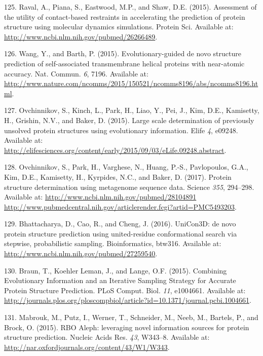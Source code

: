\documentclass[11pt,a4paper,twoside]{book}
\theoremstyle{definition}
\theoremstyle{definition}
\theoremstyle{remark}
\begin{document}
\hypertarget{ref-Raval2015a}{}
125. Raval, A., Piana, S., Eastwood, M.P., and Shaw, D.E. (2015).
Assessment of the utility of contact-based restraints in accelerating
the prediction of protein structure using molecular dynamics
simulations. Protein Sci. Available at:
\url{http://www.ncbi.nlm.nih.gov/pubmed/26266489}.

\hypertarget{ref-Wang2015}{}
126. Wang, Y., and Barth, P. (2015). Evolutionary-guided de novo
structure prediction of self-associated transmembrane helical proteins
with near-atomic accuracy. Nat. Commun. \emph{6}, 7196. Available at:
\url{http://www.nature.com/ncomms/2015/150521/ncomms8196/abs/ncomms8196.html}.

\hypertarget{ref-Ovchinnikov2015a}{}
127. Ovchinnikov, S., Kinch, L., Park, H., Liao, Y., Pei, J., Kim, D.E.,
Kamisetty, H., Grishin, N.V., and Baker, D. (2015). Large scale
determination of previously unsolved protein structures using
evolutionary information. Elife \emph{4}, e09248. Available at:
\url{http://elifesciences.org/content/early/2015/09/03/eLife.09248.abstract}.

\hypertarget{ref-Ovchinnikov2017}{}
128. Ovchinnikov, S., Park, H., Varghese, N., Huang, P.-S., Pavlopoulos,
G.A., Kim, D.E., Kamisetty, H., Kyrpides, N.C., and Baker, D. (2017).
Protein structure determination using metagenome sequence data. Science
\emph{355}, 294--298. Available at:
\href{http://www.ncbi.nlm.nih.gov/pubmed/28104891\%20http://www.pubmedcentral.nih.gov/articlerender.fcgi?artid=PMC5493203}{http://www.ncbi.nlm.nih.gov/pubmed/28104891 http://www.pubmedcentral.nih.gov/articlerender.fcgi?artid=PMC5493203}.

\hypertarget{ref-Bhattacharya2016}{}
129. Bhattacharya, D., Cao, R., and Cheng, J. (2016). UniCon3D: de novo
protein structure prediction using united-residue conformational search
via stepwise, probabilistic sampling. Bioinformatics, btw316. Available
at: \url{http://www.ncbi.nlm.nih.gov/pubmed/27259540}.

\hypertarget{ref-Braun2015}{}
130. Braun, T., Koehler Leman, J., and Lange, O.F. (2015). Combining
Evolutionary Information and an Iterative Sampling Strategy for Accurate
Protein Structure Prediction. PLoS Comput. Biol. \emph{11}, e1004661.
Available at:
\url{http://journals.plos.org/ploscompbiol/article?id=10.1371/journal.pcbi.1004661}.

\hypertarget{ref-Mabrouk2015a}{}
131. Mabrouk, M., Putz, I., Werner, T., Schneider, M., Neeb, M.,
Bartels, P., and Brock, O. (2015). RBO Aleph: leveraging novel
information sources for protein structure prediction. Nucleic Acids Res.
\emph{43}, W343--8. Available at:
\url{http://nar.oxfordjournals.org/content/43/W1/W343}.
\end{document}
